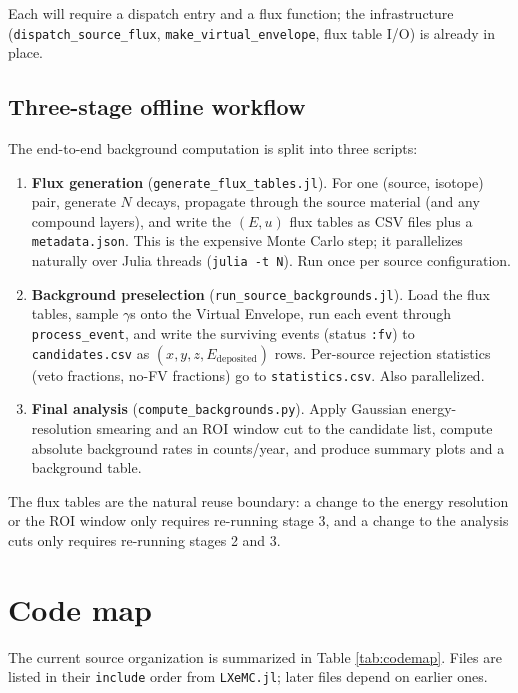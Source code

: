 \documentclass[11pt]{article}
\begin{document}
Each will require a dispatch entry and a flux function; the infrastructure
(\texttt{dispatch\_source\_flux}, \texttt{make\_virtual\_envelope},
flux table I/O) is already in place.

\subsection{Three-stage offline workflow}
\label{sec:source-stages}

The end-to-end background computation is split into three scripts:

\begin{enumerate}[label=\arabic*.]
\item \textbf{Flux generation} (\texttt{generate\_flux\_tables.jl}). For one
(source, isotope) pair, generate $N$ decays, propagate through the source
material (and any compound layers), and write the $(E, u)$ flux tables as
CSV files plus a \texttt{metadata.json}. This is the expensive Monte Carlo
step; it parallelizes naturally over Julia threads (\texttt{julia -t N}).
Run once per source configuration.
\item \textbf{Background preselection} (\texttt{run\_source\_backgrounds.jl}).
Load the flux tables, sample $\gamma$s onto the Virtual Envelope, run each
event through \texttt{process\_event}, and write the surviving events
(status \texttt{:fv}) to \texttt{candidates.csv} as
$(x, y, z, E_{\mathrm{deposited}})$ rows. Per-source rejection statistics
(veto fractions, no-FV fractions) go to \texttt{statistics.csv}. Also
parallelized.
\item \textbf{Final analysis} (\texttt{compute\_backgrounds.py}). Apply
Gaussian energy-resolution smearing and an ROI window cut to the candidate
list, compute absolute background rates in counts/year, and produce summary
plots and a background table.
\end{enumerate}

The flux tables are the natural reuse boundary: a change to the energy
resolution or the ROI window only requires re-running stage 3, and a change
to the analysis cuts only requires re-running stages 2 and 3.

\section{Code map}
\label{sec:codemap}

The current source organization is summarized in Table \ref{tab:codemap}.
Files are listed in their \texttt{include} order from
\texttt{LXeMC.jl}; later files depend on earlier ones.
\end{document}
